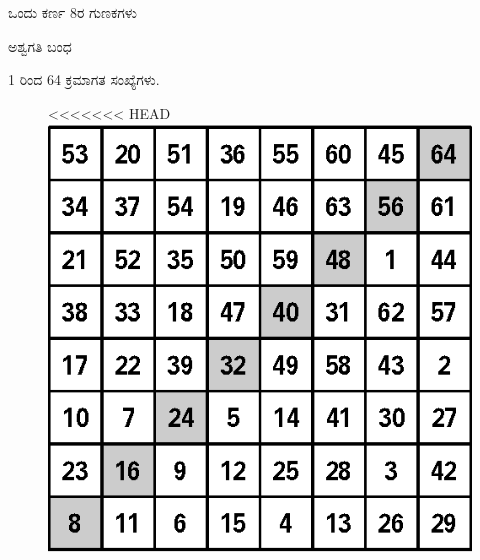 \newpage

ಒಂದು ಕರ್ಣ 8ರ ಗುಣಕಗಳು

ಅಶ್ವಗತಿ ಬಂಧ

1 ರಿಂದ 64 ಕ್ರಮಾಗತ ಸಂಖ್ಯೆಗಳು.
\begin{figure}[H]
<<<<<<< HEAD
\includegraphics{src/figures/chap6/fig6-21.eps}
\end{figure}
